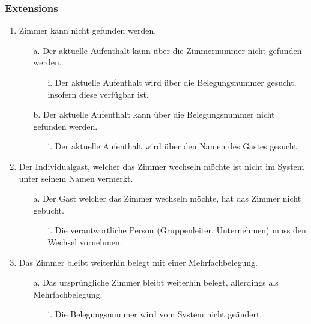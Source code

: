 \documentclass[./detailed_overview_usecases.tex]{subfiles}
\begin{document}
    \subsubsection*{Extensions}
    \begin{enumerate}
        \item Zimmer kann nicht gefunden werden.
            \begin{itemize}
                \item[a.] Der aktuelle Aufenthalt kann über die Zimmernummer nicht gefunden werden.
                    \begin{itemize}
                         \item[i.] Der aktuelle Aufenthalt wird über die Belegungsnummer gesucht, insofern diese verfügbar ist.
                    \end{itemize}
                \item[b.] Der aktuelle Aufenthalt kann über die Belegungsnummer nicht gefunden werden.
                       \begin{itemize}
                           \item[i.] Der aktuelle Aufenthalt wird über den Namen des Gastes gesucht.
                        \end{itemize}
            \end{itemize}
        \setcounter{enumi}{2}
        \item Der Individualgast, welcher das Zimmer wechseln möchte ist nicht im System unter seinem Namen vermerkt.
        \begin{itemize}
            \item[a.] Der Gast welcher das Zimmer wechseln möchte, hat das Zimmer nicht gebucht.
                \begin{itemize}
                    \item[i.] Die verantwortliche Person (Gruppenleiter, Unternehmen) muss den Wechsel vornehmen.
                \end{itemize}
        \end{itemize}
        \item Das Zimmer bleibt weiterhin belegt mit einer Mehrfachbelegung.
        \begin{itemize}
            \item[a.] Das ursprüngliche Zimmer bleibt weiterhin belegt, allerdings als Mehrfachbelegung.
                \begin{itemize}
                        \item[i.] Die Belegungsnummer wird vom System nicht geändert.

\end{itemize}
\end{itemize}
\end{enumerate}
\end{document}
